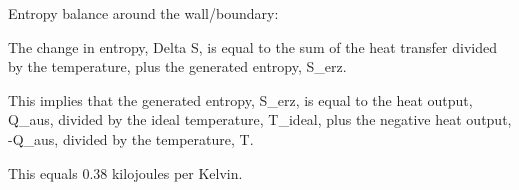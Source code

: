 Entropy balance around the wall/boundary:

The change in entropy, Delta S, is equal to the sum of the heat transfer divided by the temperature, plus the generated entropy, S_erz.

This implies that the generated entropy, S_erz, is equal to the heat output, Q_aus, divided by the ideal temperature, T_ideal, plus the negative heat output, -Q_aus, divided by the temperature, T.

This equals 0.38 kilojoules per Kelvin.